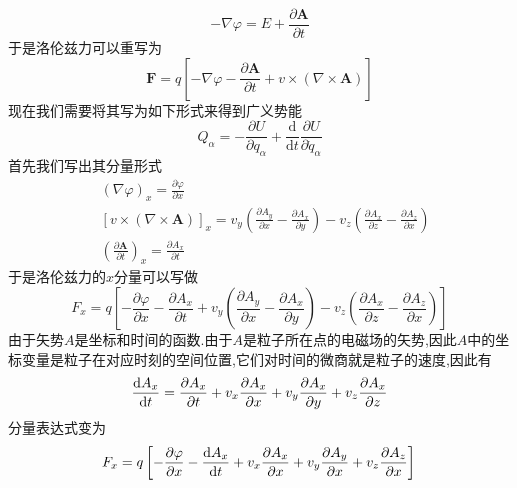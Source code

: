 \begin{equation}
    -\nabla \varphi=E+\frac{\partial \boldsymbol{A}}{\partial t}
\end{equation}
于是洛伦兹力可以重写为
\begin{equation}
    \boldsymbol{F}=q\left[-\nabla \varphi-\frac{\partial \boldsymbol{A}}{\partial t}+v \times(\nabla \times \boldsymbol{A})\right]
\end{equation}
现在我们需要将其写为如下形式来得到广义势能
\begin{equation}
    Q_{\alpha}=-\frac{\partial U}{\partial q_{\alpha}}+\frac{\mathrm d}{\mathrm d t} \frac{\partial U}{\partial \dot{q}_{\alpha}}
\end{equation}
首先我们写出其分量形式
\begin{equation}
    \begin{aligned} &(\nabla \varphi)_{x}=\frac{\partial \varphi}{\partial x} \\ &[v \times(\nabla \times \boldsymbol A)]_{x}=v_{y}\left(\frac{\partial A_{y}}{\partial x}-\frac{\partial A_{x}}{\partial y}\right)-v_{z}\left(\frac{\partial A_{x}}{\partial z}-\frac{\partial A_{z}}{\partial x}\right) \\ &\left(\frac{\partial \boldsymbol{A}}{\partial t}\right)_{x}=\frac{\partial A_{x}}{\partial t} \end{aligned}
\end{equation}
于是洛伦兹力的$ x $分量可以写做
\begin{equation}
    F_{x}=q\left[-\frac{\partial \varphi}{\partial x}-\frac{\partial A_{x}}{\partial t}+v_{y}\left(\frac{\partial A_{y}}{\partial x}-\frac{\partial A_{x}}{\partial y}\right)-v_{z}\left(\frac{\partial A_{x}}{\partial z}-\frac{\partial A_{z}}{\partial x}\right)\right]
\end{equation}
由于矢势$ A $是坐标和时间的函数.由于$ A $是粒子所在点的电磁场的矢势,因此$ A $中的坐标变量是粒子在对应时刻的空间位置,它们对时间的微商就是粒子的速度,因此有
\begin{equation}
    \frac{\mathrm{d} A_{x}}{\mathrm{d} t}=\frac{\partial A_{x}}{\partial t}+v_{x} \frac{\partial A_{x}}{\partial x}+v_{y} \frac{\partial A_{x}}{\partial y}+v_{z} \frac{\partial A_{x}}{\partial z} \\
\end{equation}
分量表达式变为
\begin{equation}
    F_{x}=q\left[-\frac{\partial \varphi}{\partial x}-\frac{\mathrm{d} A_{x}}{\mathrm{d} t}+v_{x} \frac{\partial A_{x}}{\partial x}+v_{y} \frac{\partial A_{y}}{\partial x}+v_{z} \frac{\partial A_{z}}{\partial x}\right] \\
\end{equation}
